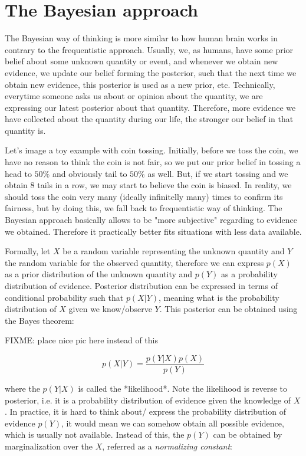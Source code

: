 \documentclass[
  digital, %
  oneside, %
  lof,     %
  lot,     %
]{fithesis4}
\begin{document}
\section{The Bayesian approach}

The Bayesian way of thinking is more similar to how human 
brain works in contrary to the frequentistic approach. 
Usually, we, as humans, have some prior belief about some 
unknown quantity or event, and whenever we obtain new 
evidence, we update our belief forming the posterior, such 
that the next time we obtain new evidence, this posterior 
is used as a new prior, etc. 
Technically, everytime someone asks us about or opinion 
about the quantity, we are expressing our latest posterior 
about that quantity. 
Therefore, more evidence we have collected about the 
quantity during our life, the stronger our belief in 
that quantity is.

Let's image a toy example with coin tossing. 
Initially, before we toss the coin, we have no reason 
to think the coin is not fair, so we put our prior belief 
in tossing a head to $50\%$ and obviously tail to 
$50\%$ as well. 
But, if we start tossing and we obtain 8 tails in a row, 
we may start to believe the coin is biased. 
In reality, we should toss the coin very many (ideally 
infinitelly many) times to confirm its fairness, but 
by doing this, we fall back to frequentistic way of 
thinking. 
The Bayesian approach basically allows to be 
"more subjective" regarding to evidence we obtained. 
Therefore it practically better fits situations with 
less data available.

Formally, let $X$ be a random variable representing 
the unknown quantity and $Y$ the random variable for 
the observed quantity, therefore we can express $p(X)$ 
as a prior distribution of the unknown quantity and 
$p(Y)$ as a probability distribution of evidence. 
Posterior distribution can be expressed in terms of 
conditional probability such that $p(X | Y)$, meaning 
what is the probability distribution of $X$ given we 
know/observe $Y$. 
This posterior can be obtained using the Bayes 
theorem:

FIXME: place nice pic here instead of this

\begin{equation}
p( X | Y ) = \frac{p( Y | X ) p(X)}{p(Y)}
\end{equation}

where the $p( Y | X )$ is called the *likelihood*. 
Note the likelihood is reverse to posterior, i.e. it 
is a probability distribution of evidence given the 
knowledge of $X$. 
In practice, it is hard to think about/ express the 
probability distribution of evidence $p(Y)$, it would 
mean we can somehow obtain all possible evidence, which 
is usually not available. 
Instead of this, the $p(Y)$ can be obtained by 
marginalization over the $X$, referred as a 
\textit{normalizing constant}:
\end{document}
